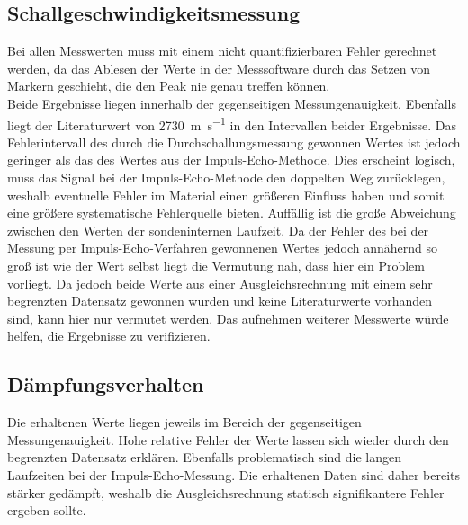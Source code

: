 \subsection{Schallgeschwindigkeitsmessung}
Bei allen Messwerten muss mit einem nicht quantifizierbaren Fehler gerechnet werden,
da das Ablesen der Werte in der Messsoftware durch das Setzen von Markern geschieht,
die den Peak nie genau treffen können.\\
Beide Ergebnisse liegen innerhalb der gegenseitigen Messungenauigkeit. Ebenfalls liegt
der Literaturwert von \SI[per-mode=reciprocal]{2730}{\metre\per\second} in den Intervallen
beider Ergebnisse. Das Fehlerintervall des durch die Durchschallungsmessung gewonnen Wertes
ist jedoch geringer als das des Wertes aus der Impuls-Echo-Methode. Dies erscheint logisch,
muss das Signal bei der Impuls-Echo-Methode den doppelten Weg zurücklegen, weshalb eventuelle
Fehler im Material einen größeren Einfluss haben und somit eine größere systematische
Fehlerquelle bieten. Auffällig ist die große Abweichung zwischen den Werten der sondeninternen
Laufzeit. Da der Fehler des bei der Messung per Impuls-Echo-Verfahren gewonnenen Wertes
jedoch annähernd so groß ist wie der Wert selbst liegt die Vermutung nah, dass hier ein
Problem vorliegt. Da jedoch beide Werte aus einer Ausgleichsrechnung mit einem sehr
begrenzten Datensatz gewonnen wurden und keine Literaturwerte vorhanden sind, kann hier nur
vermutet werden. Das aufnehmen weiterer Messwerte würde helfen, die Ergebnisse zu verifizieren.
\subsection{Dämpfungsverhalten}
Die erhaltenen Werte liegen jeweils im Bereich der gegenseitigen Messungenauigkeit.
Hohe relative Fehler der Werte lassen sich wieder durch den begrenzten Datensatz
erklären. Ebenfalls problematisch sind die langen Laufzeiten bei der Impuls-Echo-Messung.
Die erhaltenen Daten sind daher bereits stärker gedämpft, weshalb die Ausgleichsrechnung
statisch signifikantere Fehler ergeben sollte.

\newpage
\nocite{*}
\printbibliography
